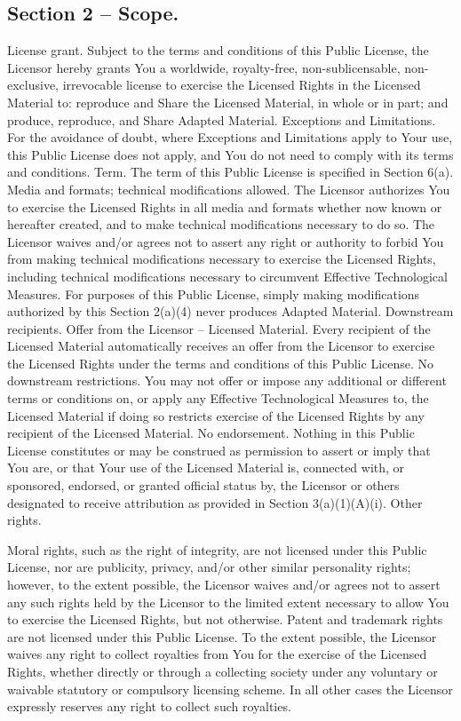 \subsection{Section 2 – Scope.}

License grant.
Subject to the terms and conditions of this Public License, the Licensor hereby grants You a worldwide, royalty-free, non-sublicensable, non-exclusive, irrevocable license to exercise the Licensed Rights in the Licensed Material to:
reproduce and Share the Licensed Material, in whole or in part; and
produce, reproduce, and Share Adapted Material.
Exceptions and Limitations. For the avoidance of doubt, where Exceptions and Limitations apply to Your use, this Public License does not apply, and You do not need to comply with its terms and conditions.
Term. The term of this Public License is specified in Section 6(a).
Media and formats; technical modifications allowed. The Licensor authorizes You to exercise the Licensed Rights in all media and formats whether now known or hereafter created, and to make technical modifications necessary to do so. The Licensor waives and/or agrees not to assert any right or authority to forbid You from making technical modifications necessary to exercise the Licensed Rights, including technical modifications necessary to circumvent Effective Technological Measures. For purposes of this Public License, simply making modifications authorized by this Section 2(a)(4) never produces Adapted Material.
Downstream recipients.
Offer from the Licensor – Licensed Material. Every recipient of the Licensed Material automatically receives an offer from the Licensor to exercise the Licensed Rights under the terms and conditions of this Public License.
No downstream restrictions. You may not offer or impose any additional or different terms or conditions on, or apply any Effective Technological Measures to, the Licensed Material if doing so restricts exercise of the Licensed Rights by any recipient of the Licensed Material.
No endorsement. Nothing in this Public License constitutes or may be construed as permission to assert or imply that You are, or that Your use of the Licensed Material is, connected with, or sponsored, endorsed, or granted official status by, the Licensor or others designated to receive attribution as provided in Section 3(a)(1)(A)(i).
Other rights.

Moral rights, such as the right of integrity, are not licensed under this Public License, nor are publicity, privacy, and/or other similar personality rights; however, to the extent possible, the Licensor waives and/or agrees not to assert any such rights held by the Licensor to the limited extent necessary to allow You to exercise the Licensed Rights, but not otherwise.
Patent and trademark rights are not licensed under this Public License.
To the extent possible, the Licensor waives any right to collect royalties from You for the exercise of the Licensed Rights, whether directly or through a collecting society under any voluntary or waivable statutory or compulsory licensing scheme. In all other cases the Licensor expressly reserves any right to collect such royalties.

